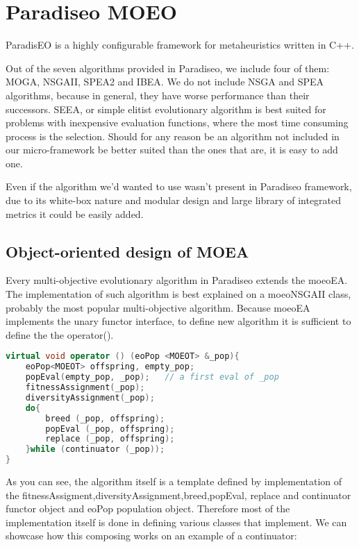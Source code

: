 \documentclass[12pt,oneside]{fithesis2}
\begin{document}
\section{Paradiseo MOEO}
ParadisEO is a highly configurable framework for metaheuristics written in C++.\cite{liefooghe2007Paradiseo} 

Out of the seven algorithms provided in Paradiseo, we include four of them: MOGA, NSGAII, SPEA2 and IBEA. We do not include NSGA and SPEA algorithms, because in general, they have worse performance than their successors. SEEA, or simple elitist evolutionary algorithm is best suited for problems with inexpensive evaluation functions, where the most time consuming process is the selection. Should for any reason be an algorithm not included in our micro-framework be better suited than the ones that are, it is easy to add one.

Even if the algorithm we'd wanted to use wasn't present in Paradiseo framework, due to its white-box nature and modular design and large library of integrated metrics it could be easily added.

\subsection{Object-oriented design of MOEA}

Every multi-objective evolutionary algorithm in Paradiseo extends the moeoEA. 
The implementation of such algorithm is best explained on a  moeoNSGAII class, probably the most popular multi-objective algorithm. 
Because moeoEA implements the unary functor interface, to define new algorithm it is sufficient to define the the operator().

\begin{lstlisting}[language=C++,label=evolution,caption=NSGAII algorithm in Paradiseo]
virtual void operator () (eoPop <MOEOT> &_pop){
    eoPop<MOEOT> offspring, empty_pop;
    popEval(empty_pop, _pop);	// a first eval of _pop
    fitnessAssignment(_pop);
    diversityAssignment(_pop);
    do{
        breed (_pop, offspring);
        popEval (_pop, offspring);
        replace (_pop, offspring);
    }while (continuator (_pop));
}
\end{lstlisting}

As you can see, the algorithm itself is a template defined by implementation of the fitnessAssigment,diversityAssignment,breed,popEval, replace and continuator functor object and eoPop population object. Therefore most of the implementation itself is done in defining various classes that implement. We can showcase how this composing works on an example of a continuator:
\end{document}
